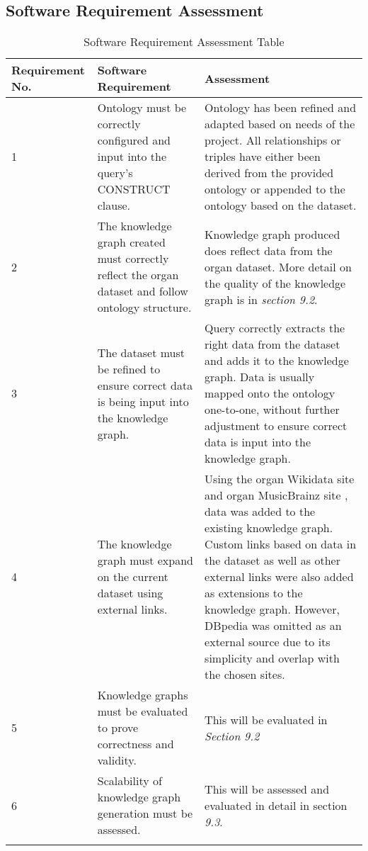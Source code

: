 \subsection{Software Requirement Assessment}
\begin{longtable}{|p{2.25cm}|p{5.5cm}|p{5.5cm}|}

\hline
\textbf{Requirement No.} & \textbf{Software Requirement} & \textbf{Assessment}\\
\hline

1& 
Ontology must be correctly configured and input into the query's CONSTRUCT clause. &
Ontology has been refined and adapted based on needs of the project. All relationships or triples have either been derived from the provided ontology or appended to the ontology based on the dataset. \\
\hline

2&
The knowledge graph created must correctly reflect the organ dataset and follow ontology structure. &
Knowledge graph produced does reflect data from the organ dataset. More detail on the quality of the knowledge graph is in \textit{section 9.2}. \\
\hline

3&
The dataset must be refined to ensure correct data is being input into the knowledge graph. &
Query correctly extracts the right data from the dataset and adds it to the knowledge graph. Data is usually mapped onto the ontology one-to-one, without further adjustment to ensure correct data is input into the knowledge graph. \\
\hline

4&
The knowledge graph must expand on the current dataset using external links. &
Using the organ Wikidata site \cite{organwikidata} and organ MusicBrainz site \cite{organmusicbrainz}, data was added to the existing knowledge graph. Custom links based on data in the dataset as well as other external links were also added as extensions to the knowledge graph. However, DBpedia was omitted as an external source due to its simplicity and overlap with the chosen sites.\\
\hline

5&
Knowledge graphs must be evaluated to prove correctness and validity. &
This will be evaluated in \textit{Section 9.2} \\ 
\hline

6&
Scalability of knowledge graph generation must be assessed. &
This will be assessed and evaluated in detail in section \textit{9.3}. \\ 
\hline
\caption{Software Requirement Assessment Table}
\end{longtable}

